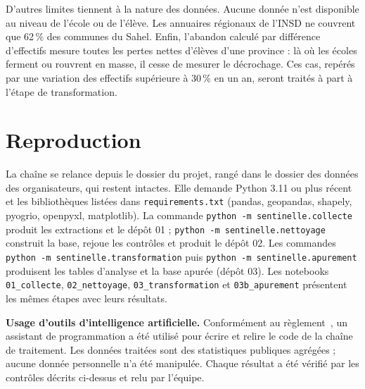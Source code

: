 \documentclass{article}
\begin{document}
D'autres limites tiennent à la nature des données. Aucune donnée n'est disponible au niveau de l'école ou de l'élève. Les annuaires régionaux de l'INSD ne couvrent que 62\,\% des communes du Sahel. Enfin, l'abandon calculé par différence d'effectifs mesure toutes les pertes nettes d'élèves d'une province : là où les écoles ferment ou rouvrent en masse, il cesse de mesurer le décrochage. Ces cas, repérés par une variation des effectifs supérieure à 30\,\% en un an, seront traités à part à l'étape de transformation.

\section{Reproduction}

La chaîne se relance depuis le dossier du projet, rangé dans le dossier des données des organisateurs, qui restent intactes. Elle demande Python 3.11 ou plus récent et les bibliothèques listées dans \texttt{requirements.txt} (pandas, geopandas, shapely, pyogrio, openpyxl, matplotlib). La commande \texttt{python -m sentinelle.collecte} produit les extractions et le dépôt 01 ; \texttt{python -m sentinelle.nettoyage} construit la base, rejoue les contrôles et produit le dépôt 02. Les commandes \texttt{python -m sentinelle.transformation} puis \texttt{python -m sentinelle.apurement} produisent les tables d'analyse et la base apurée (dépôt 03). Les notebooks \texttt{01\_collecte}, \texttt{02\_nettoyage}, \texttt{03\_transformation} et \texttt{03b\_apurement} présentent les mêmes étapes avec leurs résultats.

\textbf{Usage d'outils d'intelligence artificielle.} Conformément au règlement~\cite{dcb_document}, un assistant de programmation a été utilisé pour écrire et relire le code de la chaîne de traitement. Les données traitées sont des statistiques publiques agrégées ; aucune donnée personnelle n'a été manipulée. Chaque résultat a été vérifié par les contrôles décrits ci-dessus et relu par l'équipe.



\end{document}

